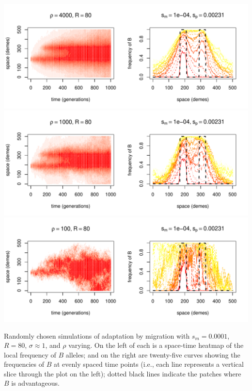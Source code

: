 \documentclass{article}
\newcommand{\includereviews}{}
\begin{document}
\begin{sfigure}
  \begin{center}
    \includegraphics{example-migration-sims/26044-r1-501-sb0_01-sm-1e-04-N4000-pophistory-run}
    \includegraphics{example-migration-sims/85750-r1-501-sb0_01-sm-1e-04-N1000-pophistory-run}
    \includegraphics{example-migration-sims/4111-r1-501-sb0_01-sm-1e-04-N100-pophistory-run}
  \end{center}
  \caption{
    Randomly chosen simulations of adaptation by migration
    with $s_m=0.0001$, $R=80$, $\sigma\approx 1$, and $\rho$ varying.
    On the left of each is a space-time heatmap of the local frequency of $B$ alleles;
    and on the right are twenty-five curves showing the frequencies of $B$ at evenly spaced time points
    (i.e., each line represents a vertical slice through the plot on the left);
    dotted black lines indicate the patches where $B$ is advantageous.
  } \label{sfig:sims_8}
\end{sfigure}






\includereviews
\end{document}
